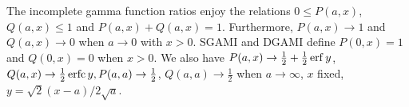 \documentclass[twoside]{MATH77}
\begin{document}
The incomplete gamma function ratios enjoy the relations $0 \leq P(a,x)$, $%
Q(a,x) \leq 1$ and $P(a,x) +Q(a,x) = 1$. Furthermore, $P(a,x) \rightarrow 1$
and $Q(a,x) \rightarrow 0$ when $a \rightarrow 0$ with $x > 0$. SGAMI and
DGAMI define $P(0,x) = 1$ and $Q(0,x) = 0$ when $x > 0$. We also have $%
P(a,x) \rightarrow \frac 12 + \frac 12 \erf y$, $Q(a,x) \rightarrow
\frac 12 \erfc y, P(a,a) \rightarrow \frac 12$, $Q(a,a)
\rightarrow \frac 12$ when $a \rightarrow \infty $, $x$ fixed, $y = \sqrt
2(x-a)/2\sqrt a$.
%
% 
% 
% 
\end{document}
